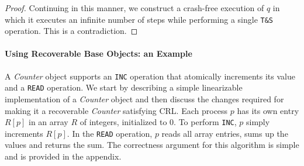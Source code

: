 \begin{proof}
Continuing in this manner, we construct a crash-free execution of $q$ in which it executes an infinite number of steps while performing a single \texttt{T\&S} operation. This is a contradiction.
\end{proof}


\paragraph*{Using Recoverable Base Objects: an Example}





A \textit{Counter} object supports an \texttt{INC} operation that atomically increments its value and a \texttt{READ} operation. We start by describing a simple linearizable implementation of a \textit{Counter} object and then discuss the changes required for making it a recoverable \textit{Counter} satisfying CRL.
Each process $p$ has its own entry $R[p]$ in an array $R$ of integers, initialized to 0. To perform \texttt{INC}, $p$ simply increments $R[p]$. In the \texttt{READ} operation, $p$ reads all array entries, sums up the values and returns the sum. The correctness argument for this algorithm is simple and is provided in the appendix.

